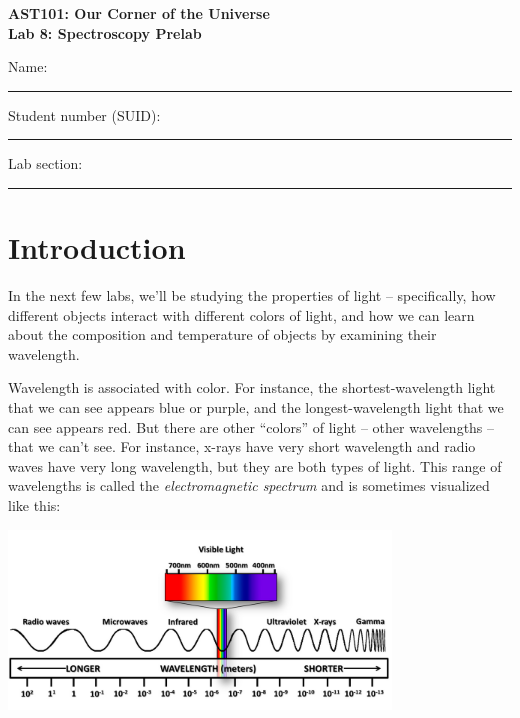 \documentclass[11pt]{article}
\begin{document}
\begin{center}
\textbf{\Large
AST101: Our Corner of the Universe \\
\vspace*{0.1cm}
Lab 8: Spectroscopy Prelab 
}
\end{center}

\vspace*{0.5cm}

{\Large Name:}\vspace*{0.5cm}\\\hrule
{\Large Student number (SUID):}\vspace*{0.5cm}\\\hrule
{\Large Lab section:}\vspace*{0.5cm}\\\hrule
\vspace*{0.5cm}

\section{Introduction}

In the next few labs, we'll be studying the properties of light -- specifically, how different objects interact with different colors of light, and how we can learn about the composition and temperature of objects by examining their wavelength.

Wavelength is associated with color. For instance, the shortest-wavelength light that we can see appears blue or purple, and the longest-wavelength light that we can see appears red. But there are other ``colors'' of light -- other wavelengths -- that we 
can't see. For instance, x-rays have very short wavelength and radio waves have very long wavelength, but they are both types of light. This range of wavelengths is called the {\it electromagnetic spectrum} and is sometimes visualized like this:

\begin{center}
\includegraphics[width=4in]{linear-spectrum.jpg}
\end{center}
\end{document}
